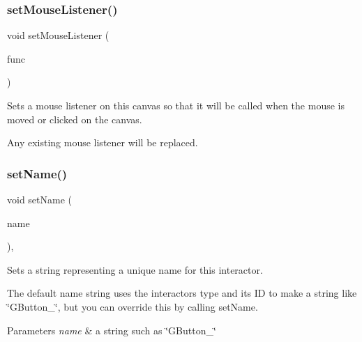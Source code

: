 \subsubsection{\texorpdfstring{set\+Mouse\+Listener()}{setMouseListener()}\hspace{0.1cm}{\footnotesize\ttfamily [2/2]}}
{\footnotesize\ttfamily void set\+Mouse\+Listener (\begin{DoxyParamCaption}\item[{G\+Event\+Listener\+Void}]{func }\end{DoxyParamCaption})\hspace{0.3cm}{\ttfamily [virtual]}}



Sets a mouse listener on this canvas so that it will be called when the mouse is moved or clicked on the canvas. 

Any existing mouse listener will be replaced. \mbox{\label{classGInteractor_a9d3a2685df23b5e7cbf59c19c4a1f9b5}} 
\subsubsection{\texorpdfstring{set\+Name()}{setName()}}
{\footnotesize\ttfamily void set\+Name (\begin{DoxyParamCaption}\item[{const std\+::string \&}]{name }\end{DoxyParamCaption})\hspace{0.3cm}{\ttfamily [virtual]}, {\ttfamily [inherited]}}



Sets a string representing a unique name for this interactor. 

The default name string uses the interactor\textquotesingle{}s type and its ID to make a string like \char`\"{}\+G\+Button\+\_\char`\"{}, but you can override this by calling set\+Name. 
\begin{DoxyParams}{Parameters}
{\em name} & a string such as \char`\"{}\+G\+Button\+\_\char`\"{} \\
\hline
\end{DoxyParams}
\mbox{\label{classGDrawingSurface_a09f9640e4ff7388dcfc391efd88d2415}} 
